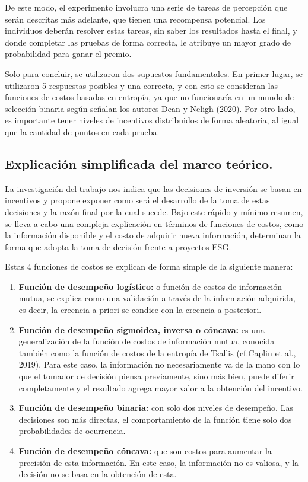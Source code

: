 \documentclass[11pt,letterpaper]{article}
\begin{document}
De este modo, el experimento involucra una serie de tareas de percepción que serán descritas más adelante, que tienen una recompensa potencial. Los individuos deberán resolver estas tareas, sin saber los resultados hasta el final, y donde completar las pruebas de forma correcta, le atribuye un mayor grado de probabilidad para ganar el premio.

Solo para concluir, se utilizaron dos supuestos fundamentales. En primer lugar, se utilizaron 5 respuestas posibles y una correcta, y con esto se consideran las funciones de costos basadas en entropía, ya que no funcionaría en un mundo de selección binaria según señalan los autores Dean y Neligh (2020). Por otro lado, es importante tener niveles de incentivos distribuidos de forma aleatoria, al igual que la cantidad de puntos en cada prueba.





\subsection{Explicación simplificada del marco teórico.}

La investigación del trabajo nos indica que las decisiones de inversión se basan en incentivos y propone exponer como será el desarrollo de la toma de estas decisiones y la razón final por la cual sucede. Bajo este rápido y mínimo resumen, se lleva a cabo una compleja explicación en términos de funciones de costos, como la información disponible y el costo de adquirir nueva información, determinan la forma que adopta la toma de decisión frente a proyectos ESG.

Estas 4 funciones de costos se explican de forma simple de la siguiente manera:

\begin{enumerate}
    \item \textbf{Función de desempeño logístico:} o función de costos de información mutua, se explica como una validación a través de la información adquirida, es decir, la creencia a priori se condice con la creencia a posteriori. 
    \item \textbf{Función de desempeño sigmoidea, inversa o cóncava:} es una generalización de la función de costos de información mutua, conocida también como la función de costos de la entropía de Tsallis (cf.Caplin et al., 2019). Para este caso, la información no necesariamente va de la mano con lo que el tomador de decisión piensa previamente, sino más bien, puede diferir completamente y el resultado agrega mayor valor a la obtención del incentivo. 
    \item \textbf{Función de desempeño binaria:} con solo dos niveles de desempeño. Las decisiones son más directas, el comportamiento de la función tiene solo dos probabilidades de ocurrencia.
    \item \textbf{Función de desempeño cóncava:} que son costos para aumentar la precisión de esta información. En este caso, la información no es valiosa, y la decisión no se basa en la obtención de esta. 
    
\end{enumerate}
\end{document}
